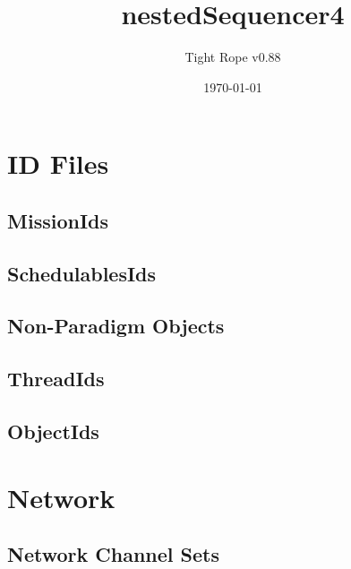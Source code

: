 \documentclass[10pt,a4paper]{article}
\title{nestedSequencer4}
\author{Tight Rope v0.88}
\date{\today}
\begin{document}
\maketitle

\section{ID Files}
\subsection{MissionIds}

\newpage

\subsection{SchedulablesIds}

\newpage

\subsection{Non-Paradigm Objects}
\newpage

\subsection{ThreadIds}

\newpage

\subsection{ObjectIds}

\newpage

\section{Network}
\subsection{Network Channel Sets}




{}
\end{document}
